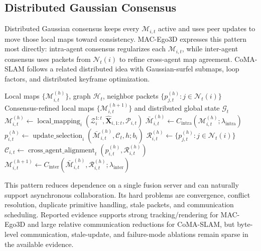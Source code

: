 \documentclass[11pt, a4paper, logo]{googledeepmind}
\begin{document}
\subsection{Distributed Gaussian Consensus}

Distributed Gaussian consensus keeps every $\mathcal{M}_{i,t}$ active and uses peer updates to move those local maps toward consistency. MAC-Ego3D expresses this pattern most directly: intra-agent consensus regularizes each $\mathcal{M}_{i,t}$, while inter-agent consensus uses packets from $\mathcal{N}_t(i)$ to refine cross-agent map agreement. CoMA-SLAM follows a related distributed idea with Gaussian-surfel submaps, loop factors, and distributed keyframe optimization.

\begin{algorithm}[H]
\caption{Distributed Gaussian consensus pattern}
\label{alg:taxonomy-distributed-consensus}
\small
\begin{algorithmic}[1]
  \Require Local maps $\{\mathcal{M}_{i,t}^{(h)}\}$, graph $\mathcal{H}_t$, neighbor packets $\{p_{j,t}^{(h)}:j\in\mathcal{N}_t(i)\}$
  \Ensure Consensus-refined local maps $\{\mathcal{M}_{i,t}^{(h+1)}\}$ and distributed global state $\mathcal{G}_t$
  \State $\mathcal{M}_{i,t}^{(h)} \gets \operatorname{local\_mapping}_i(\mathcal{Z}_i^{1:t},\hat{\mathbf{X}}_{i,1:t},\mathcal{P}_{i,t})$ 
  \State $\bar{\mathcal{M}}_{i,t}^{(h)} \gets C_{\mathrm{intra}}(\mathcal{M}_{i,t}^{(h)};\lambda_{\mathrm{intra}})$ 
  \State $p_{i,t}^{(h)} \gets \operatorname{update\_selection}_i(\bar{\mathcal{M}}_{i,t}^{(h)},\mathcal{C}_t,h;b_i)$ 
  \State $\mathcal{R}_{i,t}^{(h)} \gets \{p_{j,t}^{(h)}:j\in\mathcal{N}_t(i)\}$ 
  \State $\mathcal{C}_{i,t} \gets \operatorname{cross\_agent\_alignment}_t(p_{i,t}^{(h)},\mathcal{R}_{i,t}^{(h)})$ 
  \State $\mathcal{M}_{i,t}^{(h+1)} \gets C_{\mathrm{inter}}(\bar{\mathcal{M}}_{i,t}^{(h)},\mathcal{R}_{i,t}^{(h)};\lambda_{\mathrm{inter}})$ 
\end{algorithmic}
\end{algorithm}

This pattern reduces dependence on a single fusion server and can naturally support asynchronous collaboration. Its hard problems are convergence, conflict resolution, duplicate primitive handling, stale packets, and communication scheduling. Reported evidence supports strong tracking/rendering for MAC-Ego3D and large relative communication reductions for CoMA-SLAM, but byte-level communication, stale-update, and failure-mode ablations remain sparse in the available evidence.
\end{document}
